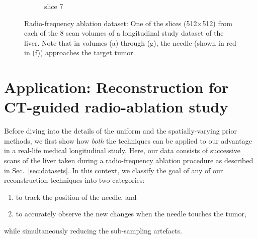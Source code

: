 \documentclass[journal]{IEEEtran}
\begin{document}
\begin{figure}[h!]
\begin{subfigure}[b]{0.23\linewidth}
 \caption{slice 7}
    \end{subfigure}     
     \caption{Radio-frequency ablation dataset: One of the slices (512$\times$512) from each of the 8 scan volumes of a longitudinal study dataset of the liver. Note that in volumes (a) through (g), the needle (shown in red in (f)) approaches the target tumor.} 
\label{fig:RFA2_test_object-prior}
\end{figure}

\section{Application: Reconstruction for CT-guided radio-ablation study}
\label{sec:tmh}
Before diving into the details of the uniform and the
spatially-varying prior methods, we first show how \textit{both} the
techniques can be applied to our advantage in a real-life medical
longitudinal study. Here, our data consists of successive scans of the liver taken
during a radio-frequency ablation procedure as described in Sec.~\ref{sec:datasets}. In this context, we classify the goal of any of our
reconstruction techniques into two categories: 
\begin{enumerate}
\item to track the position of the needle, and%
\item to accurately observe the new changes when the needle touches the tumor,%
\end{enumerate}
while simultaneously reducing the sub-sampling artefacts.
\end{document}
